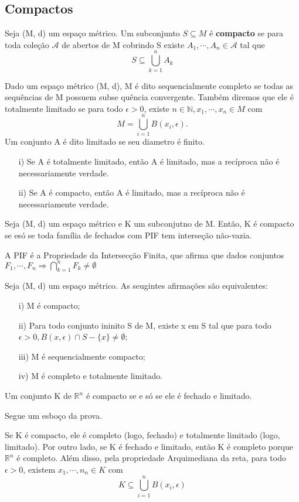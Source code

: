 \documentclass[ComplexAnalysis/complex.tex]{subfiles}
\begin{document}
\subsection{Compactos}
\begin{def*}
	Seja (M, d) um espaço métrico. Um subconjunto $S\subseteq{M}$ é \textbf{compacto} se para toda coleção $\mathcal{A}$
	de abertos de M cobrindo S existe $A_1, \cdots, A_{n}\in \mathcal{A}$ tal que
	$$
		S\subseteq\bigcup_{k=1}^{n}A_{k}
	$$
\end{def*}
Dado um espaço métrico (M, d), M é dito sequencialmente completo se todas as sequências de M possuem subse
quência convergente. Também diremos que ele é totalmente limitado se para todo $\epsilon > 0$, existe $n\in \mathbb{N},
	x_{1}, \cdots, x_{n}\in{M}$ com
$$
	M = \bigcup_{i=1}^{n}B(x_{i}, \epsilon).
$$
Um conjunto A é dito limitado se seu diametro é finito.
\begin{exer*}
	\begin{itemize}
		\item[i)] Se A é totalmente limitado, então A é limitado, mas a recíproca não é necessariamente verdade.
		\item[ii)] Se A é compacto, então A é limitado, mas a recíproca não é necessariamente verdade.
	\end{itemize}
\end{exer*}
\begin{prop*}
	Seja (M, d) um espaço métrico e K um subconjutno de M. Então, K é compacto se esó se toda família de fechados com PIF tem
	interseção não-vazia.
\end{prop*}
A PIF é a Propriedade da Intersecção Finita, que afirma que dados conjuntos $F _{1}, \cdots, F_{n}\Rightarrow \bigcap\limits_{k=1}^{n}F_{k}\neq\emptyset$
\begin{theorem*}
	Seja (M, d) um espaço métrico. As seugintes afirmações são equivalentes:
	\begin{itemize}
		\item[i)]M é compacto;
		\item[ii)] Para todo conjunto ininito S de M, existe x em S tal que para todo $\epsilon > 0, B(x, \epsilon)\cap{S-\{x\}}\neq\emptyset$;
		\item[iii)] M é sequencialmente compacto;
		\item[iv)] M é completo e totalmente limitado.
	\end{itemize}
\end{theorem*}
\begin{theorem*}
	Um conjunto K de $\mathbb{R}^{n}$ é compacto se e só se ele é fechado e limitado.
\end{theorem*}
Segue um esboço da prova.
\begin{proof*}
	Se K é compacto, ele é completo (logo, fechado) e totalmente limitado (logo, limitado). Por outro lado, se K é fechado
	e limitado, então K é completo porque $\mathbb{R}^{n}$ é completo. Além disso, pela propriedade Arquimediana da reta,
	para todo $\epsilon > 0$, existem $x_1, \cdots, n_{n}\in{K}$ com
	$$
		K\subseteq{\bigcup_{i=1}^{n}B(x_{i}, \epsilon)}
	$$
\end{proof*}
\end{document}
